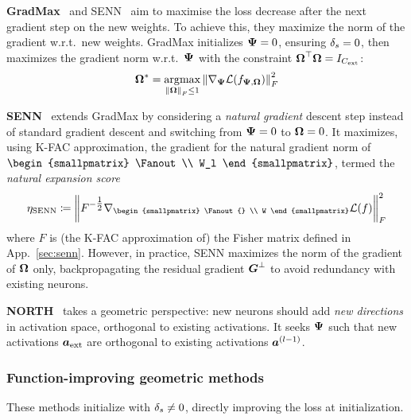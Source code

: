 \textbf{GradMax}~\citep{evci_gradmax_2022} and SENN~\citep{mitchell_self-expanding_2024} aim to maximise the loss decrease after the next gradient step on the new weights. To achieve this, they maximize the norm of the gradient w.r.t.\ new weights. GradMax initializes $\Fanin = 0$, ensuring $\deltas = 0$, then maximizes the gradient norm w.r.t.\ $\Fanin$ with the constraint $\trans{\Fanout} \Fanout  = I_{\cext}$:
\begin{align}\label{eqn:gradmax}
\Fanout^* = \argmax_{\frob{\Fanout} \leq 1} \frob{\nabla_{\Fanin} \loss(f_{\Fanin, \Fanout})}^2
\end{align}

\textbf{SENN}~\citep{mitchell_self-expanding_2024} extends GradMax by considering a \emph{natural gradient} descent step instead of standard gradient descent and switching from $\Fanin = 0$ to $\Fanout = 0$.
It maximizes, using K-FAC approximation, the gradient for the natural gradient norm of $\begin{smallpmatrix}
    \Fanout \\ W_l
\end{smallpmatrix}$, termed the \emph{natural expansion score}
\begin{equation}\label{eq:senn_main}
\eta_{\text{SENN}} \coloneqq \frob{F^{-\tfrac{1}{2}}\nabla_{\begin{smallpmatrix}
\Fanout{} \\
W
\end{smallpmatrix}}\loss(f)}^2
\end{equation}
where $F$ is (the K-FAC approximation of) the Fisher matrix defined in App.~\ref{sec:senn}. However, in practice, SENN maximizes the norm of the gradient of $\Fanout$ only, backpropagating the residual gradient $\Bottleneck$ to avoid redundancy with existing neurons.

\textbf{NORTH}~\citep{maile_when_2022} takes a geometric perspective: new neurons should add \emph{new directions} in activation space, orthogonal to existing activations. It seeks $\Fanin$ such that new activations $\Postactext$ are orthogonal to existing activations $\Postact[l-1]$.

\subsubsection{Function-improving geometric methods}

These methods initialize with $\deltas \neq 0$, directly improving the loss at initialization.


